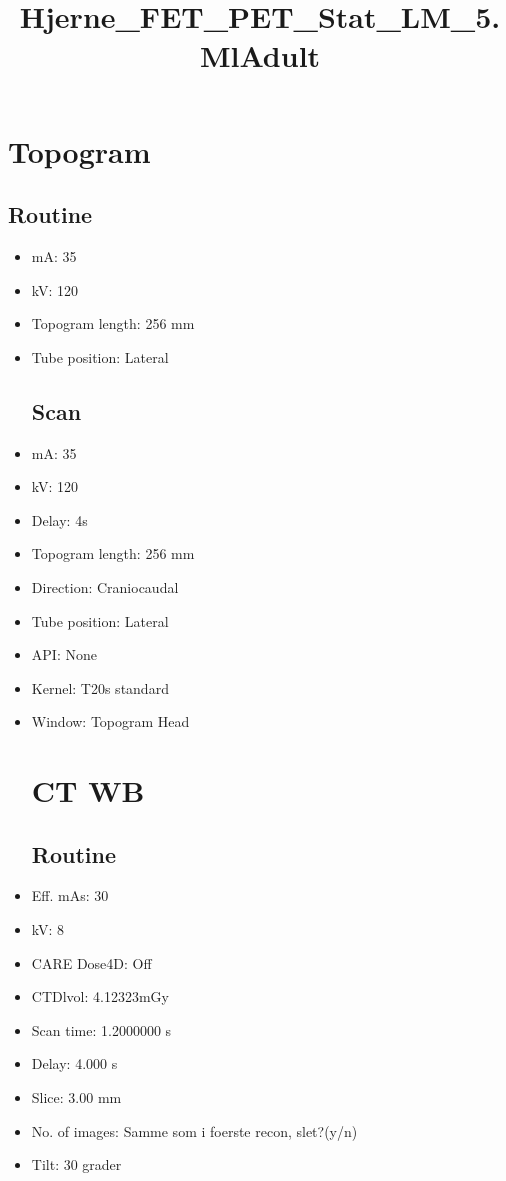 \documentclass[12pt]{article}
\title{Hjerne\_FET\_PET\_Stat\_LM\_5.MlAdult}
\begin{document}
\maketitle
\newpage
\tableofcontents
\newpage
{}


\section{Topogram}
\subsection{Routine}
 \begin{itemize}\item mA: 35\item kV: 120\item Topogram length: 256 mm\item Tube position: Lateral
\subsection{Scan}
\item mA: 35\item kV: 120\item Delay: 4s\item Topogram length: 256 mm\item Direction: Craniocaudal\item Tube position: Lateral\item API: None\item Kernel: T20s standard\item Window: Topogram Head
\section{CT WB}
\subsection{Routine}
\item Eff. mAs: 30\item kV: 8\item CARE Dose4D: Off\item CTDlvol: 4.12323mGy\item Scan time: 1.2000000 s\item Delay: 4.000 s\item Slice: 3.00 mm\item No. of images: Samme som i foerste recon, slet?(y/n)\item Tilt: 30 grader

\end{itemize}
\end{document}
